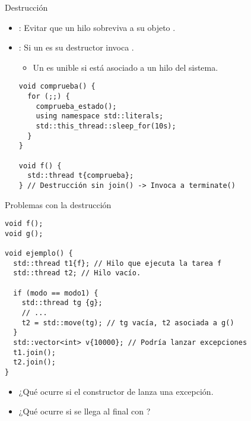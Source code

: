 \begin{frame}[t,fragile]{Destrucción}
\begin{itemize}
  \item {}: Evitar que un hilo sobreviva a su objeto .
  \item {}: Si un  es  su destructor invoca .
    \begin{itemize}
      \item Un  es unible si está asociado a un hilo del sistema.
    \end{itemize}
\begin{lstlisting}
void comprueba() {
  for (;;) {
    comprueba_estado();
    using namespace std::literals;
    std::this_thread::sleep_for(10s);
  }
}

void f() {
  std::thread t{comprueba};
} // Destrucción sin join() -> Invoca a terminate()
\end{lstlisting}
\end{itemize}
\end{frame}

\begin{frame}[t,fragile]{Problemas con la destrucción}
\begin{lstlisting}
void f();
void g();

void ejemplo() {
  std::thread t1{f}; // Hilo que ejecuta la tarea f
  std::thread t2; // Hilo vacío.

  if (modo == modo1) {
    std::thread tg {g}; 
    // ...
    t2 = std::move(tg); // tg vacía, t2 asociada a g()
  }
  std::vector<int> v{10000}; // Podría lanzar excepciones
  t1.join();
  t2.join();
}
\end{lstlisting}
\begin{itemize}
  \item ¿Qué ocurre si el constructor de  lanza una excepción.
  \item ¿Qué ocurre si se llega al final con ?
\end{itemize}
\end{frame}

